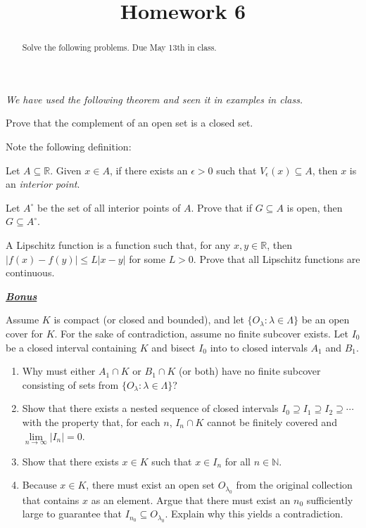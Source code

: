 \documentclass{ximera}
\begin{document}
    \title{Homework 6}
    \begin{abstract} Solve the following problems.  Due May 13th in class. \end{abstract}
    \maketitle

\textit{We have used the following theorem and seen it in examples in class.}
\begin{exercise}
    Prove that the complement of an open set is a closed set.
\end{exercise}

Note the following definition:
\begin{definition}
    Let $A \subseteq \mathbb{R}$.  Given $x \in A$, if there exists an $\epsilon>0$ such that $V_\epsilon(x) \subseteq A$, then $x$ is an \textit{interior point}.
\end{definition}
\begin{exercise}
    Let $A^\circ$ be the set of all interior points of $A$.  Prove that if $G \subseteq A$ is open, then $G \subseteq A^\circ$. 
\end{exercise}

\begin{exercise}
    A Lipschitz function is a function such that, for any $x, y \in \mathbb{R}$, then $|f(x) - f(y)| \leq L |x-y|$ for some $L > 0$.  Prove that all Lipschitz functions are continuous.
\end{exercise}

\underline{\textbf{\textit{Bonus}}}
\begin{exercise}
    Assume $K$ is compact (or closed and bounded), and let $\{O_\lambda:\lambda \in \Lambda\}$ be an open cover for $K$.  For the sake of contradiction, assume no finite subcover exists.  Let $I_0$ be a closed interval containing $K$ and bisect $I_0$ into to closed intervals $A_1$ and $B_1$.
    \begin{enumerate}
        \item Why must either $A_1 \cap K$ or $B_1 \cap K$ (or both) have no finite subcover consisting of sets from $\{O_\lambda : \lambda \in \Lambda\}$?
        \item Show that there exists a nested sequence of closed intervals $I_0 \supseteq I_1 \supseteq I_2 \supseteq \cdots$ with the property that, for each $n$, $I_n \cap K$ cannot be finitely covered and $\lim\limits_{n\to \infty} |I_n| = 0$.
        \item Show that there exists $x \in K$ such that $x \in I_n$ for all $n \in \mathbb{N}$.
        \item Because $x \in K$, there must exist an open set $O_{\lambda_0}$ from the original collection that contains $x$ as an element.  Argue that there must exist an $n_0$ sufficiently large to guarantee that $I_{n_0} \subseteq O_{\lambda_0}$.  Explain why this yields a contradiction.
    \end{enumerate}
\end{exercise}
\end{document}
